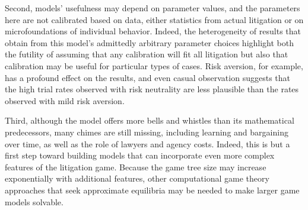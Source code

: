 \documentclass{article}
\begin{document}
Second, models' usefulness may depend on parameter values, and the parameters here are not calibrated based on data, either statistics from actual litigation or on microfoundations of individual behavior. Indeed, the heterogeneity of results that obtain from this model's admittedly arbitrary parameter choices highlight both the futility of assuming that any calibration will fit all litigation but also that calibration may be useful for particular types of cases. Risk aversion, for example, has a profound effect on the results, and even casual observation suggests that the high trial rates observed with risk neutrality are less plausible than the rates observed with mild risk aversion. 

Third, although the model offers more bells and whistles than its mathematical predecessors, many chimes are still missing, including learning and bargaining over time, as well as the role of lawyers and agency costs. Indeed, this is but a first step toward building models that can incorporate even more complex features of the litigation game. Because the game tree size may increase exponentially with additional features, other computational game theory approaches that seek approximate equilibria may be needed to make larger game models solvable. 

\printbibliography
\end{document}
